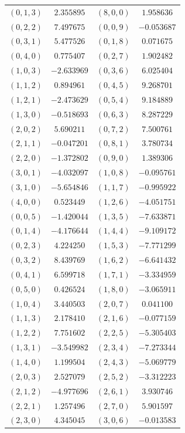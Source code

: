 \begin{table}
\begin{tabular}{cc@{\qquad}cc}
$(0,1,3)$ & $2.355895$ & $(8,0,0)$ & $1.958636$ \\
$(0,2,2)$ & $7.497675$ & $(0,0,9)$ & $-0.053687$ \\
$(0,3,1)$ & $5.477526$ & $(0,1,8)$ & $0.071675$ \\
$(0,4,0)$ & $0.775407$ & $(0,2,7)$ & $1.902482$ \\
$(1,0,3)$ & $-2.633969$ & $(0,3,6)$ & $6.025404$ \\
$(1,1,2)$ & $0.894961$ & $(0,4,5)$ & $9.268701$ \\
$(1,2,1)$ & $-2.473629$ & $(0,5,4)$ & $9.184889$ \\
$(1,3,0)$ & $-0.518693$ & $(0,6,3)$ & $8.287229$ \\
$(2,0,2)$ & $5.690211$ & $(0,7,2)$ & $7.500761$ \\
$(2,1,1)$ & $-0.047201$ & $(0,8,1)$ & $3.780734$ \\
$(2,2,0)$ & $-1.372802$ & $(0,9,0)$ & $1.389306$ \\
$(3,0,1)$ & $-4.032097$ & $(1,0,8)$ & $-0.095761$ \\
$(3,1,0)$ & $-5.654846$ & $(1,1,7)$ & $-0.995922$ \\
$(4,0,0)$ & $0.523449$ & $(1,2,6)$ & $-4.051751$ \\
$(0,0,5)$ & $-1.420044$ & $(1,3,5)$ & $-7.633871$ \\
$(0,1,4)$ & $-4.176644$ & $(1,4,4)$ & $-9.109172$ \\
$(0,2,3)$ & $4.224250$ & $(1,5,3)$ & $-7.771299$ \\
$(0,3,2)$ & $8.439769$ & $(1,6,2)$ & $-6.641432$ \\
$(0,4,1)$ & $6.599718$ & $(1,7,1)$ & $-3.334959$ \\
$(0,5,0)$ & $0.426524$ & $(1,8,0)$ & $-3.065911$ \\
$(1,0,4)$ & $3.440503$ & $(2,0,7)$ & $0.041100$ \\
$(1,1,3)$ & $2.178410$ & $(2,1,6)$ & $-0.077159$ \\
$(1,2,2)$ & $7.751602$ & $(2,2,5)$ & $-5.305403$ \\
$(1,3,1)$ & $-3.549982$ & $(2,3,4)$ & $-7.273344$ \\
$(1,4,0)$ & $1.199504$ & $(2,4,3)$ & $-5.069779$ \\
$(2,0,3)$ & $2.527079$ & $(2,5,2)$ & $-3.312223$ \\
$(2,1,2)$ & $-4.977696$ & $(2,6,1)$ & $3.930746$ \\
$(2,2,1)$ & $1.257496$ & $(2,7,0)$ & $5.901597$ \\
$(2,3,0)$ & $4.345045$ & $(3,0,6)$ & $-0.013583$ \\

\end{tabular}
\end{table}
